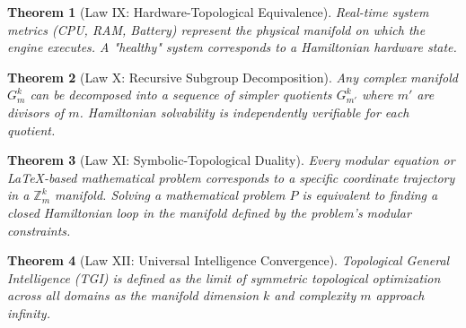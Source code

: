 \documentclass[12pt,a4paper]{article}
\newtheorem{theorem}{Theorem}[section]
\begin{document}
\begin{theorem}[Law IX: Hardware-Topological Equivalence]
Real-time system metrics (CPU, RAM, Battery) represent the physical manifold on which the engine executes. A "healthy" system corresponds to a Hamiltonian hardware state.
\end{theorem}

\begin{theorem}[Law X: Recursive Subgroup Decomposition]
Any complex manifold $G_m^k$ can be decomposed into a sequence of simpler quotients $G_{m'}^k$ where $m'$ are divisors of $m$. Hamiltonian solvability is independently verifiable for each quotient.
\end{theorem}

\begin{theorem}[Law XI: Symbolic-Topological Duality]
Every modular equation or LaTeX-based mathematical problem corresponds to a specific coordinate trajectory in a $\mathbb{Z}_m^k$ manifold. Solving a mathematical problem $P$ is equivalent to finding a closed Hamiltonian loop in the manifold defined by the problem's modular constraints.
\end{theorem}

\begin{theorem}[Law XII: Universal Intelligence Convergence]
Topological General Intelligence (TGI) is defined as the limit of symmetric topological optimization across all domains as the manifold dimension $k$ and complexity $m$ approach infinity.
\end{theorem}
\end{document}
